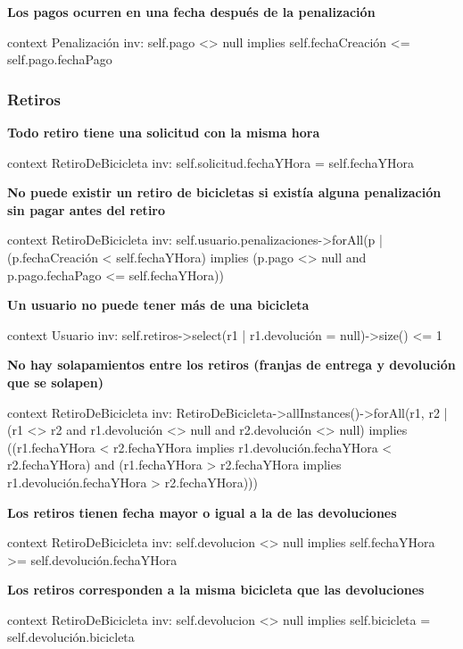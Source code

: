 \documentclass[a4paper, 10pt, twoside]{article}
\newenvironment{ocl}[1]
  {
    \textbf{#1}
    \verbatim
  }{
    \endverbatim
  }
\begin{document}
\begin{ocl}{Los pagos ocurren en una fecha después de la penalización}
  context Penalización
  inv: self.pago <> null implies self.fechaCreación <= self.pago.fechaPago
\end{ocl}


\subsubsection{Retiros}

\begin{ocl}{Todo retiro tiene una solicitud con la misma hora}
  context RetiroDeBicicleta
  inv: self.solicitud.fechaYHora = self.fechaYHora
\end{ocl}

\begin{ocl}{No puede existir un retiro de bicicletas si existía alguna penalización sin pagar antes del retiro}
  context RetiroDeBicicleta
  inv: self.usuario.penalizaciones->forAll(p |
           (p.fechaCreación < self.fechaYHora) implies
               (p.pago <> null and
               p.pago.fechaPago <= self.fechaYHora))
\end{ocl}

\begin{ocl}{Un usuario no puede tener más de una bicicleta}
  context Usuario
  inv: self.retiros->select(r1 | r1.devolución = null)->size() <= 1
\end{ocl}

\begin{ocl}{No hay solapamientos entre los retiros (franjas de entrega y devolución que se solapen)}
  context RetiroDeBicicleta
  inv: RetiroDeBicicleta->allInstances()->forAll(r1, r2 |
           (r1 <> r2 and r1.devolución <> null and r2.devolución <> null) implies
               ((r1.fechaYHora < r2.fechaYHora implies
                   r1.devolución.fechaYHora < r2.fechaYHora) and
                (r1.fechaYHora > r2.fechaYHora implies
                   r1.devolución.fechaYHora > r2.fechaYHora)))
\end{ocl}

\begin{ocl}{Los retiros tienen fecha mayor o igual a la de las devoluciones}
  context RetiroDeBicicleta
  inv: self.devolucion <> null implies self.fechaYHora >= self.devolución.fechaYHora
\end{ocl}

\begin{ocl}{Los retiros corresponden a la misma bicicleta que las devoluciones}
  context RetiroDeBicicleta
  inv: self.devolucion <> null implies self.bicicleta = self.devolución.bicicleta
\end{ocl}
\end{document}
